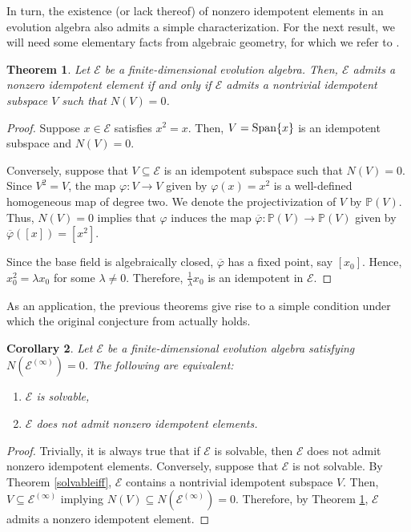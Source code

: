 \documentclass[11pt]{article}
\newtheorem{thm}{Theorem}[section]
\newtheorem{cor}[thm]{Corollary}
\theoremstyle{definition}
\numberwithin{equation}{section}
\begin{document}
\begin{aiblock}
In turn, the existence (or lack thereof) of nonzero idempotent elements in an evolution algebra also admits a simple characterization. For the next result, we will need some elementary facts from algebraic geometry, for which we refer to \cite{Harris}.


\begin{thm}\label{idempotentiff}
    Let $\mathcal E$ be a finite-dimensional evolution algebra. Then, $\mathcal E$ admits a nonzero idempotent element if and only if $\mathcal E$ admits a nontrivial idempotent subspace $V$ such that $N(V) = 0$.
\end{thm}
\begin{proof}
    Suppose $x\in \mathcal E$ satisfies $x^2 = x$. Then, $V=\operatorname{Span}\{x\}$ is an idempotent subspace and $N(V) = 0$.

    Conversely, suppose that $V\subseteq \mathcal E$ is an idempotent subspace such that $N(V)=0$.  Since $V^2 = V$, the map $\varphi:V\to V$ given by $\varphi(x) = x^2$ is a well-defined homogeneous map of degree two. We denote the projectivization of $V$ by $\mathbb{P}(V)$. Thus, $N(V) = 0$ implies that $\varphi$ induces the map $\overline{\varphi}:\mathbb P(V)\to \mathbb P(V)$ given by $\overline{\varphi}([x]) = [x^2]$.

    Since the base field is algebraically closed, $\overline{\varphi}$ has a fixed point, say $[x_0]$. Hence, $x_0^2 =\lambda x_0$ for some $\lambda \neq 0$. Therefore, $\frac{1}{\lambda} x_0$ is an idempotent in $\mathcal E$.
\end{proof}


As an application, the previous theorems give rise to a simple condition under which the original conjecture from \cite{GP26} actually holds.


\begin{cor}\label{thecorollary}
 Let $\mathcal E$ be a finite-dimensional evolution algebra satisfying $N(\mathcal E^{(\infty)}) = 0$.
 The following are equivalent:

 \begin{enumerate}
     \item $\mathcal E$ is solvable,
     \item $\mathcal E$ does not admit nonzero idempotent elements.
 \end{enumerate}


\end{cor}
\begin{proof}
    Trivially, it is always true that if $\mathcal E$ is solvable, then $\mathcal E$ does not admit nonzero idempotent elements. Conversely, suppose that $\mathcal E$ is not solvable. By Theorem \ref{solvableiff}, $\mathcal E$ contains a nontrivial idempotent subspace $V$. Then, $V\subseteq \mathcal E^{(\infty)}$ implying $N(V) \subseteq N(\mathcal E^{(\infty)}) = 0$. Therefore, by Theorem \ref{idempotentiff},  $\mathcal E$ admits a nonzero idempotent element.
\end{proof}

\end{aiblock}
\end{document}

